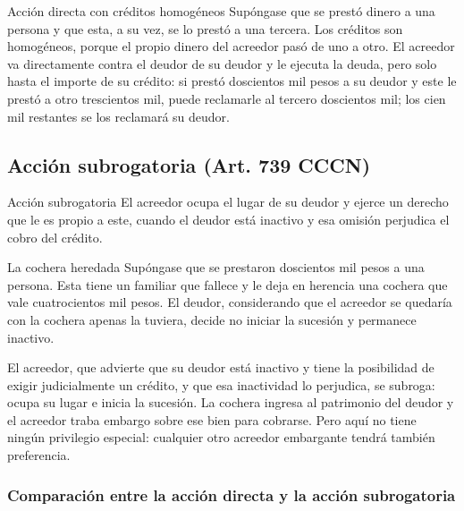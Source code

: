\documentclass[12pt,oneside]{book}
\begin{document}
\begin{example}{Acción directa con créditos homogéneos}
Supóngase que se prestó dinero a una persona y que esta, a su vez, se lo prestó a una tercera. Los créditos son homogéneos, porque el propio dinero del acreedor pasó de uno a otro. El acreedor va directamente contra el deudor de su deudor y le ejecuta la deuda, pero solo hasta el importe de su crédito: si prestó doscientos mil pesos a su deudor y este le prestó a otro trescientos mil, puede reclamarle al tercero doscientos mil; los cien mil restantes se los reclamará su deudor.
\end{example}

\subsection{Acción subrogatoria (Art. 739 CCCN)}

\begin{definition}{Acción subrogatoria}
El acreedor ocupa el lugar de su deudor y ejerce un derecho que le es propio a este, cuando el deudor está inactivo y esa omisión perjudica el cobro del crédito.
\end{definition}

\begin{example}{La cochera heredada}
Supóngase que se prestaron doscientos mil pesos a una persona. Esta tiene un familiar que fallece y le deja en herencia una cochera que vale cuatrocientos mil pesos. El deudor, considerando que el acreedor se quedaría con la cochera apenas la tuviera, decide no iniciar la sucesión y permanece inactivo.

El acreedor, que advierte que su deudor está inactivo y tiene la posibilidad de exigir judicialmente un crédito, y que esa inactividad lo perjudica, se subroga: ocupa su lugar e inicia la sucesión. La cochera ingresa al patrimonio del deudor y el acreedor traba embargo sobre ese bien para cobrarse. Pero aquí no tiene ningún privilegio especial: cualquier otro acreedor embargante tendrá también preferencia.
\end{example}

\subsubsection{Comparación entre la acción directa y la acción subrogatoria}
\end{document}
